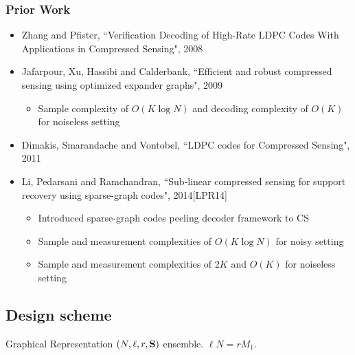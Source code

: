 \begin{frame}\frametitle{Prior Work}
\begin{itemize}
\item Zhang and Pfister, ``Verification Decoding of High-Rate LDPC Codes With Applications in Compressed Sensing", 2008
\item  Jafarpour, Xu, Hassibi and Calderbank, ``Efficient and robust compressed sensing using optimized expander graphs", 2009
\begin{itemize}
\item Sample complexity of $O(K\log N)$ and decoding complexity of $O(K)$ for noiseless setting
\end{itemize}
\item Dimakis, Smarandache and Vontobel, ``LDPC codes for Compressed Sensing", 2011

\vspace{3ex}
\item Li, Pedarsani and Ramchandran, ``Sub-linear compressed sensing for support recovery using sparse-graph codes", 2014[LPR14]
\begin{itemize}
\item Introduced sparse-graph codes peeling decoder framework to CS
\item Sample and measurement complexities of $O(K\log N)$ for noisy setting
\item Sample and measurement complexities of $2K$ and $O(K)$ for noiseless setting
\end{itemize}
\end{itemize}
\end{frame}

\subsection{Design scheme}
\begin{frame}{Graphical Representation}
$(N,\ell,r,\mathbf{S})$ ensemble. $\ell N=rM_1$. 
\begin{figure}
\scalebox{1.3}{}
\end{figure}
\end{frame}

